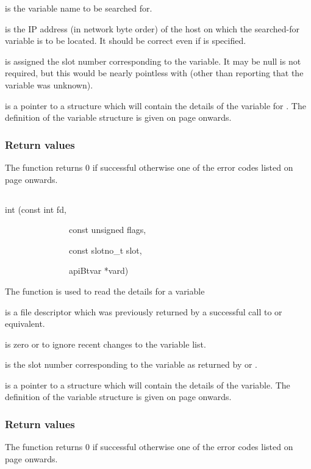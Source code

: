  is the variable name to be searched for.

 is the IP address (in network byte order) of
the host on which the searched-for variable is to be located. It should
be correct even if  is
specified.

 is assigned the slot number corresponding to
the variable. It may be null is not required, but this would be nearly
pointless with \funcnameXBvarfindslot{} (other than reporting that the variable
was unknown).

 is a pointer to a structure which will
contain the details of the variable for
\filename{\funcnameXBvarfind{}}. The definition of the variable
structure is given on page \pageref{bkm:Varstructure} onwards.

\subsubsection{Return values}
The function returns 0 if successful otherwise one of the error codes
listed on page \pageref{errorcodes} onwards.

\subsection{\funcnameXBvarread{}}

\begin{expara}

int \funcnameXBvarread{}(const int fd,

\ \ \ \ \ \ \ \ \ \ \ \ \ \ \ const unsigned flags,

\ \ \ \ \ \ \ \ \ \ \ \ \ \ \ const slotno\_t slot,

\ \ \ \ \ \ \ \ \ \ \ \ \ \ \ apiBtvar *vard)

\end{expara}

The function \funcXBvarread{} is used to read the
details for a variable

 is a file descriptor which was previously
returned by a successful call to \funcXBopen{} or equivalent.

 is zero or
 to ignore recent changes to
the variable list.

 is the slot number corresponding to the
variable as returned by \funcXBvarlist{} or
\funcXBvarfind{}.

 is a pointer to a structure which will
contain the details of the variable. The definition of the variable
structure is given on page \pageref{bkm:Varstructure} onwards.

\subsubsection{Return values}
The function returns 0 if successful otherwise one of the error codes
listed on page \pageref{errorcodes} onwards.

